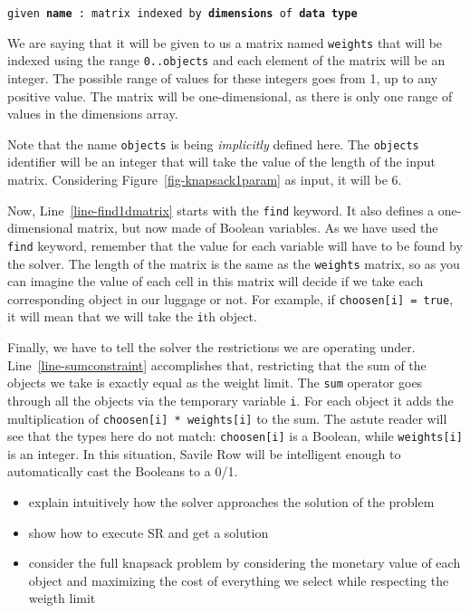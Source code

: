 \texttt{given \textbf{name} : matrix indexed by \textbf{dimensions} of \textbf{data type}}

We are saying that it will be given to us a matrix named \texttt{weights} that
will be indexed using the range \texttt{0..objects} and each element of the
matrix will be an integer. The possible range of values for these integers goes
from 1, up to any positive value. The matrix will be one-dimensional, as there
is only one range of values in the dimensions array.

Note that the name \texttt{objects} is being \emph{implicitly} defined here. The
\texttt{objects} identifier will be an integer that will take the value of the
length of the input matrix. Considering Figure~\ref{fig-knapsack1param} as
input, it will be 6.

Now, Line~\ref{line-find1dmatrix} starts with the \texttt{find} keyword. 
It also defines a one-dimensional matrix, but now made of Boolean variables. As
we have used the \texttt{find} keyword, remember that the value for each
variable will have to be found by the solver.  The length of the matrix is the
same as the \texttt{weights} matrix, so as you can imagine the value of each cell in this
matrix will decide if we take each corresponding object in our luggage or not.
For example, if \texttt{choosen[i] = true}, it will mean that we will take the
\texttt{i}th object.

Finally, we have to tell the solver the restrictions we are operating under.
Line~\ref{line-sumconstraint} accomplishes that, restricting that the sum of
the objects we take is exactly equal as the weight limit.
The \texttt{sum} operator goes through all the objects via the temporary
variable \texttt{i}. For each object it adds the multiplication of
\texttt{choosen[i] * weights[i]} to the sum. The astute reader will see that
the types here do not match: \texttt{choosen[i]} is a Boolean, while
\texttt{weights[i]} is an integer. In this situation, Savile Row will be
intelligent enough to automatically cast the Booleans to a 0/1.

\begin{itemize}
\item explain intuitively how the solver approaches the solution of the problem
\item show how to execute SR and get a solution
\item consider the full knapsack problem by considering the monetary value of each object
and maximizing the cost of everything we select while respecting the weigth limit
\end{itemize}

